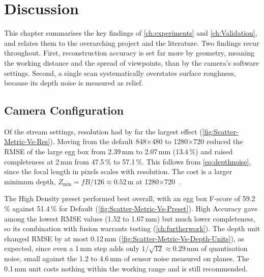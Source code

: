 \chapter{Discussion}
\label{ch:discussion}

This chapter summarises the key findings of \autoref{ch:experiments} and \autoref{ch:Validation}, and relates them to the overarching project and the literature. Two findings recur throughout. First, reconstruction accuracy is set far more by geometry, meaning the working distance and the spread of viewpoints, than by the camera's software settings. Second, a single scan systematically overstates surface roughness, because its depth noise is measured as relief.

\section{Camera Configuration}

Of the stream settings, resolution had by far the largest effect (\autoref{fig:Scatter-Metric-Vs-Res}). Moving from the default 848$\times$480 to 1280$\times$720 reduced the RMSE of the large egg box from 2.39\,mm to 2.07\,mm (13.4\,\%) and raised completeness at 2\,mm from 47.5\,\% to 57.1\,\%. This follows from \autoref{eq:depthnoise}, since the focal length in pixels scales with resolution. The cost is a larger minimum depth, $Z_{\min}=fB/126 \approx 0.52$\,m at 1280$\times$720~\cite{intel_d456}.

The High Density preset performed best overall, with an egg box F-score of 59.2\,\% against 51.4\,\% for Default (\autoref{fig:Scatter-Metric-Vs-Preset}). High Accuracy gave among the lowest RMSE values (1.52 to 1.67\,mm) but much lower completeness, so its combination with fusion warrants testing (\autoref{ch:furtherwork}). The depth unit changed RMSE by at most 0.12\,mm (\autoref{fig:Scatter-Metric-Vs-Depth-Units}), as expected, since even a 1\,mm step adds only $1/\sqrt{12}\approx0.29$\,mm of quantisation noise, small against the 1.2 to 4.6\,mm of sensor noise measured on planes. The 0.1\,mm unit costs nothing within the working range and is still recommended.

